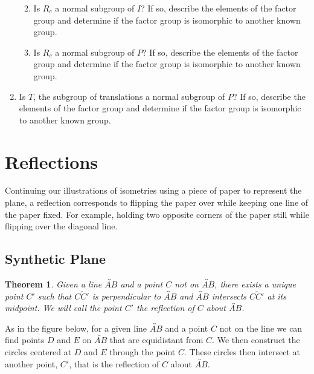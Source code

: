 \documentclass[
]{book}
\providecommand{\tightlist}{%
  \setlength{\itemsep}{0pt}\setlength{\parskip}{0pt}}
\let\stdsection\section
\renewcommand\section{\newpage\stdsection}
\newtheorem{theorem}{Theorem}[chapter]
\theoremstyle{definition}
\theoremstyle{definition}
\theoremstyle{definition}
\theoremstyle{definition}
\theoremstyle{remark}
\begin{document}
\begin{enumerate}
  \begin{enumerate}
  \def\labelenumii{\alph{enumii}.}
  \tightlist
  \item
    Is \(R_c\) a normal subgroup of \(I\)? If so, describe the elements of the factor group and determine if the factor group is isomorphic to another known group.
  \item
    Is \(R_c\) a normal subgroup of \(P\)? If so, describe the elements of the factor group and determine if the factor group is isomorphic to another known group.
  \end{enumerate}
\item
  Is \(T\), the subgroup of translations a normal subgroup of \(P\)? If so, describe the elements of the factor group and determine if the factor group is isomorphic to another known group.
\end{enumerate}

\hypertarget{reflections-1}{%
\section{Reflections}\label{reflections-1}}

Continuing our illustrations of isometries using a piece of paper to represent the plane, a reflection corresponds to flipping the paper over while keeping one line of the paper fixed. For example, holding two opposite corners of the paper still while flipping over the diagonal line.

\hypertarget{synthetic-plane-3}{%
\subsection{Synthetic Plane}\label{synthetic-plane-3}}

\begin{theorem}
Given a line \(\overleftrightarrow{AB}\) and a point \(C\) not on \(\overleftrightarrow{AB}\), there exists a unique point \(C'\) such that \(\overline{CC'}\) is perpendicular to \(\overleftrightarrow{AB}\) and \(\overleftrightarrow{AB}\) intersects \(\overline{CC'}\) at its midpoint. We will call the point \(C'\) the reflection of \(C\) about \(\overleftrightarrow{AB}\).
\end{theorem}

As in the figure below, for a given line \(\overleftrightarrow{AB}\) and a point \(C\) not on the line we can find points \(D\) and \(E\) on \(\overleftrightarrow{AB}\) that are equidistant from \(C\). We then construct the circles centered at \(D\) and \(E\) through the point \(C\). These circles then intersect at another point, \(C'\), that is the reflection of \(C\) about \(\overleftrightarrow{AB}\).
\end{document}
